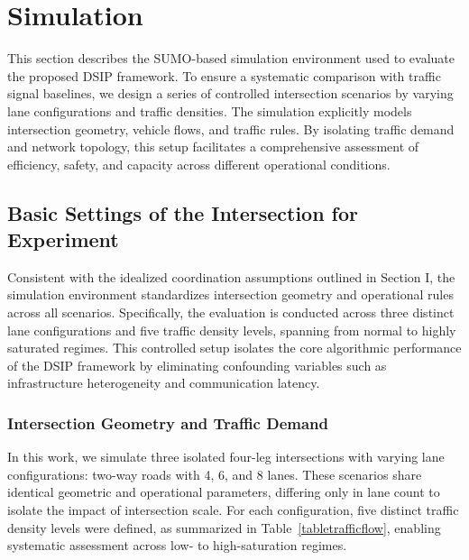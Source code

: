\documentclass[journal]{IEEEtran}
\begin{document}
\section{Simulation}

This section describes the SUMO-based simulation environment used to evaluate the proposed DSIP framework. To ensure a systematic comparison with traffic signal baselines, we design a series of controlled intersection scenarios by varying lane configurations and traffic densities. The simulation explicitly models intersection geometry, vehicle flows, and traffic rules. By isolating traffic demand and network topology, this setup facilitates a comprehensive assessment of efficiency, safety, and capacity across different operational conditions.

\subsection{Basic Settings of the Intersection for Experiment}  

Consistent with the idealized coordination assumptions outlined in Section I, the simulation environment standardizes intersection geometry and operational rules across all scenarios. Specifically, the evaluation is conducted across three distinct lane configurations and five traffic density levels, spanning from normal to highly saturated regimes. This controlled setup isolates the core algorithmic performance of the DSIP framework by eliminating confounding variables such as infrastructure heterogeneity and communication latency.

\subsubsection{Intersection Geometry and Traffic Demand}

In this work, we simulate three isolated four-leg intersections with varying lane configurations: two-way roads with 4, 6, and 8 lanes. These scenarios share identical geometric and operational parameters, differing only in lane count to isolate the impact of intersection scale. For each configuration, five distinct traffic density levels were defined, as summarized in Table~\ref{tabletrafficflow}, enabling systematic assessment across low- to high-saturation regimes.
\end{document}
